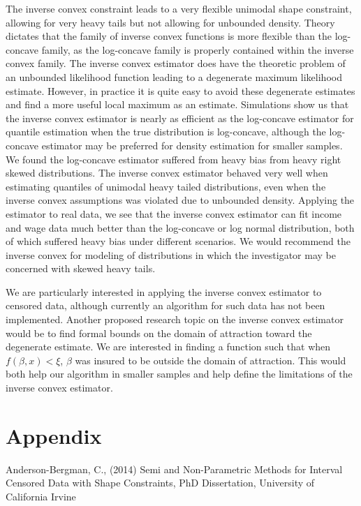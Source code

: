 \documentclass[11pt]{article}
\numberwithin{equation}{section}
\begin{document}
	The inverse convex constraint leads to a very flexible unimodal shape constraint, allowing for very heavy tails but not allowing for unbounded density. Theory dictates that the family of inverse convex functions is more flexible than the log-concave family, as the log-concave family is properly contained within the inverse convex family. The inverse convex estimator does have the theoretic problem of an unbounded likelihood function leading to a degenerate maximum likelihood estimate. However, in practice it is quite easy to avoid these degenerate estimates and find a more useful local maximum as an estimate. Simulations show us that the inverse convex estimator is nearly as efficient as the log-concave estimator for quantile estimation when the true distribution is log-concave, although the log-concave estimator may be preferred for density estimation for smaller samples. We found the log-concave estimator suffered from heavy bias from heavy right skewed distributions. The inverse convex estimator behaved very well when estimating quantiles of unimodal heavy tailed distributions, even when the inverse convex assumptions was violated due to unbounded density. Applying the estimator to real data, we see that the inverse convex estimator can fit income and wage data much better than the log-concave or log normal distribution, both of which suffered heavy bias under different scenarios. We would recommend the inverse convex for modeling of distributions in which the investigator may be concerned with skewed heavy tails. 
	
	We are particularly interested in applying the inverse convex estimator to censored data, although currently an algorithm for such data has not been implemented. Another proposed research topic on the inverse convex estimator would be to find formal bounds on the domain of attraction toward the degenerate estimate. We are interested in finding a function such that when $f(\beta,x) < \xi$, $\beta$ was insured to be outside the domain of attraction. This would both help our algorithm in smaller samples and help define the limitations of the inverse convex estimator. 


{\section{Appendix}}

Anderson-Bergman, C., (2014) Semi and Non-Parametric Methods for Interval Censored Data with Shape Constraints, PhD Dissertation, University of California Irvine
\end{document}
